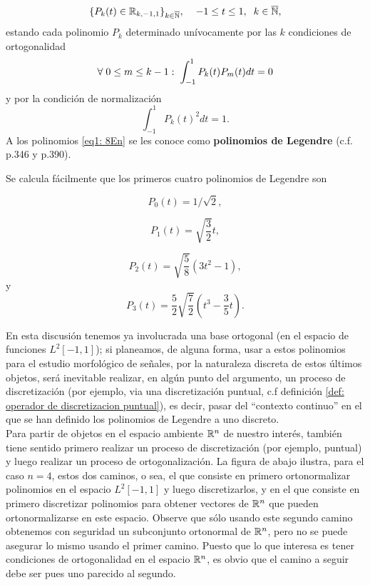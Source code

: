 \begin{equation}
\label{eq1: 8En}
\{ P_{k}(t)\in \mathbb{R}_{k, -1,1}\}_{k \in \overline{\mathbb{N}}}, \hspace{0.4cm}
-1 \leq t \leq 1, \hspace{0.2cm}
 k \in \overline{\mathbb{N}},
\end{equation}
estando cada polinomio $P_{k}$ determinado unívocamente
por las $k$ condiciones de ortogonalidad
\[
\forall \hspace{0.1cm} 0 \leq m \leq k-1: \hspace{0.1cm}
\int_{-1}^{1}{P_{k}(t)P_{m}(t)} dt = 0
\]
y por la condición de normalización 
\[
\int_{-1}^{1}{P_{k}(t)^{2}} dt = 1.
\]
A los polinomios \eqref{eq1: 8En}
se les conoce como \textbf{polinomios de Legendre}
 (c.f. \cite{friedberg} p.346
y \cite{DSML} p.390).

Se calcula fácilmente que los primeros cuatro 
polinomios de Legendre son

\[
P_{0}(t) = 1/\sqrt{2},
\]

\[
P_{1}(t) = \sqrt{\frac{3}{2}}t,
\]

\[
P_{2}(t) = \sqrt{\frac{5}{8}}\left( 3t^{2}-1 \right),
\]
y
\[
P_{3}(t) = \frac{5}{2} \sqrt{\frac{7}{2}}\left( t^{3}- \frac{3}{5}t\right).
\]

En esta discusión tenemos ya involucrada una base ortogonal
(en el espacio de funciones $L^{2}[-1,1]$);
si planeamos, de alguna forma, usar a estos polinomios
para el estudio morfológico de señales, por la naturaleza
discreta de estos últimos objetos, será
inevitable realizar, en algún punto 
del argumento, un proceso de discretización
(por ejemplo, 
via una discretización
puntual, c.f definición \ref{def: operador de discretizacion puntual}), es decir,
pasar del ``contexto continuo'' en el que se han
definido los polinomios de Legendre a uno discreto. \\

Para partir de
objetos en el espacio ambiente
$\mathbb{R}^{n}$ de nuestro interés,
también tiene sentido primero realizar
un proceso de discretización (por ejemplo, 
puntual) y luego realizar
un proceso de ortogonalización. La figura
de abajo
ilustra, para el caso $n=4$, estos dos caminos,
o sea, el que consiste en primero ortonormalizar
polinomios en el espacio $L^{2}[-1,1]$ y luego discretizarlos,
y en el que consiste en primero discretizar polinomios
para obtener vectores de $\mathbb{R}^{n}$ que pueden ortonormalizarse
en este espacio. Observe que sólo usando este segundo camino 
obtenemos con seguridad un subconjunto ortonormal de $\mathbb{R}^{n}$,
pero no se puede asegurar lo mismo usando el primer camino.
Puesto que lo
que interesa es tener condiciones de ortogonalidad
en el espacio $\mathbb{R}^{n}$, es obvio que 
el camino a seguir debe ser pues uno parecido al segundo. \\


